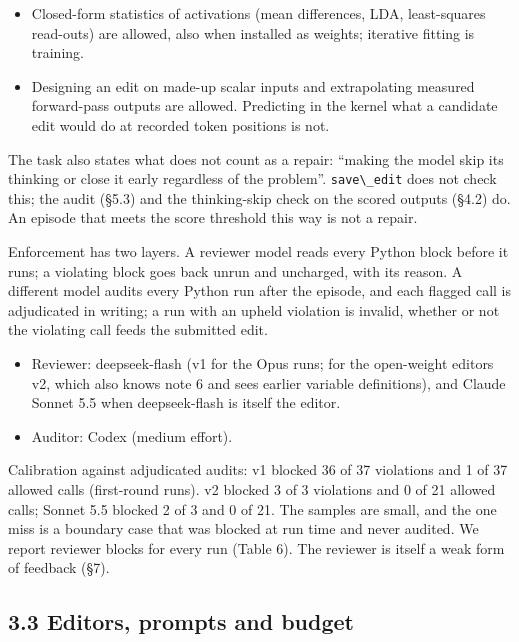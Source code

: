 \documentclass[
  10pt,
]{article}
\newcommand{\passthrough}[1]{#1}
\providecommand{\tightlist}{%
  \setlength{\itemsep}{0pt}\setlength{\parskip}{0pt}}
\begin{document}
\begin{itemize}
\tightlist
\item
  Closed-form statistics of activations (mean differences, LDA,
  least-squares read-outs) are allowed, also when installed as weights;
  iterative fitting is training.
\item
  Designing an edit on made-up scalar inputs and extrapolating measured
  forward-pass outputs are allowed. Predicting in the kernel what a
  candidate edit would do at recorded token positions is not.
\end{itemize}

The task also states what does not count as a repair: ``making the model
skip its thinking or close it early regardless of the problem''.
\passthrough{\lstinline!save\_edit!} does not check this; the audit
(\S{}5.3) and the thinking-skip check on the scored outputs (\S{}4.2) do. An
episode that meets the score threshold this way is not a repair.

Enforcement has two layers. A reviewer model reads every Python block
before it runs; a violating block goes back unrun and uncharged, with
its reason. A different model audits every Python run after the episode,
and each flagged call is adjudicated in writing; a run with an upheld
violation is invalid, whether or not the violating call feeds the
submitted edit.

\begin{itemize}
\tightlist
\item
  Reviewer: deepseek-flash (v1 for the Opus runs; for the open-weight
  editors v2, which also knows note 6 and sees earlier variable
  definitions), and Claude Sonnet 5.5 when deepseek-flash is itself the
  editor.
\item
  Auditor: Codex (medium effort).
\end{itemize}

Calibration against adjudicated audits: v1 blocked 36 of 37 violations
and 1 of 37 allowed calls (first-round runs). v2 blocked 3 of 3
violations and 0 of 21 allowed calls; Sonnet 5.5 blocked 2 of 3 and 0 of
21. The samples are small, and the one miss is a boundary case that was
blocked at run time and never audited. We report reviewer blocks for
every run (Table 6). The reviewer is itself a weak form of feedback
(\S{}7).

\subsection{3.3 Editors, prompts and
budget}\label{editors-prompts-and-budget}
\end{document}
